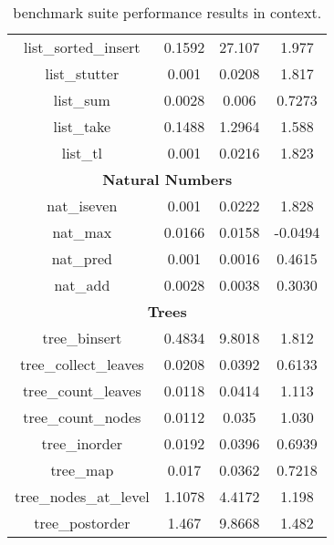 \begin{table}
\begin{center}
\begin{tabular}{cccc}
list\_sorted\_insert & 0.1592 & 27.107 & 1.977 \\
list\_stutter & 0.001 & 0.0208 & 1.817 \\
list\_sum & 0.0028 & 0.006 & 0.7273 \\
list\_take & 0.1488 & 1.2964 & 1.588 \\
list\_tl & 0.001 & 0.0216 & 1.823 \\
\multicolumn{4}{c}{\textbf{Natural Numbers}} \\
nat\_iseven & 0.001 & 0.0222 & 1.828 \\
nat\_max & 0.0166 & 0.0158 & -0.0494 \\
nat\_pred & 0.001 & 0.0016 & 0.4615 \\
nat\_add & 0.0028 & 0.0038 & 0.3030 \\
\multicolumn{4}{c}{\textbf{Trees}} \\
tree\_binsert & 0.4834 & 9.8018 & 1.812 \\
tree\_collect\_leaves & 0.0208 & 0.0392 & 0.6133 \\
tree\_count\_leaves & 0.0118 & 0.0414 & 1.113 \\
tree\_count\_nodes & 0.0112 & 0.035 & 1.030 \\
tree\_inorder & 0.0192 & 0.0396 & 0.6939 \\
tree\_map & 0.017 & 0.0362 & 0.7218 \\
tree\_nodes\_at\_level & 1.1078 & 4.4172 & 1.198 \\
tree\_postorder & 1.467 & 9.8668 & 1.482 \\

  \hline
  \end{tabular}
  \end{center}
  \caption[\myth{} benchmark suite performance results in context]{%
    \myth{} benchmark suite performance results in context.
  }
  \label{tbl:myth-raw-context}
\end{table}
